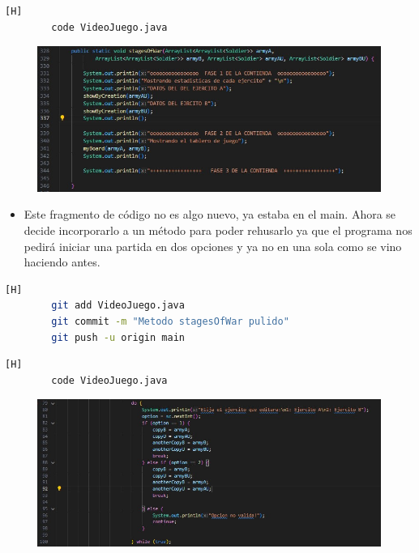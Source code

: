 \documentclass{article}
\begin{document}
	\begin{lstlisting}[language=bash,caption={Se crea un metodo que brinda detalles del enfrentamiento}][H]
		code VideoJuego.java
	\end{lstlisting}
	
	\begin{figure}[H]
		\centering
		\includegraphics[width=1\textwidth,keepaspectratio]{img/stages.jpg}
	\end{figure}
	
		
	\begin{itemize}	
		\item Este fragmento de código no es algo nuevo, ya estaba en el main. Ahora se decide incorporarlo a un método para poder rehusarlo ya que el programa nos pedirá iniciar una partida en dos opciones y ya no en una sola como se vino haciendo antes.
	\end{itemize}
	
	
	\begin{lstlisting}[language=bash,caption={Commit: 5818ab3f0158ea7f297ac2415bb32b86f8057596}][H]
		git add VideoJuego.java
		git commit -m "Metodo stagesOfWar pulido"			
		git push -u origin main
	\end{lstlisting}
	
	
	\begin{lstlisting}[language=bash,caption={Se crean arreglos por referencia}][H]
		code VideoJuego.java
	\end{lstlisting}
	
	\begin{figure}[H]
		\centering
		\includegraphics[width=1\textwidth,keepaspectratio]{img/copyReference.jpg}
	\end{figure}
	
\end{document}
